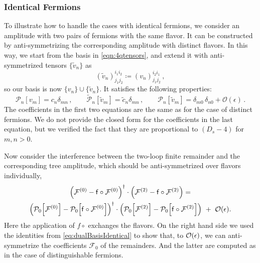\subsubsection{Identical Fermions}
To illustrate how to handle the cases with identical fermions,
we consider an amplitude with two pairs of fermions with the same flavor. 
It can be constructed by anti-symmetrizing the corresponding amplitude with distinct flavors.
In this way, we start from the basis in \cref{eqn:4qtensors},
and extend it with anti-symmetrized tensors $\{\tilde v_n\}$ as
\begin{equation}\label{eq:basisIdentical}
	(\tilde v_n)_{j_1j_2}^{i_1i_2} \coloneqq  (v_n)_{j_1j_2}^{i_2i_1}\,,
\end{equation}
so our basis is now $\{v_n\}\cup \{\tilde{v}_n\}$.
It satisfies the following properties:
\begin{equation}\label{eq:dualBasisIdentical}
  \mathcal{P}_n[v_m]= c_n \delta_{m n}\,,\qquad
  \mathcal{\tilde{P}}_n[\tilde{v}_m]= \tilde{c}_n \delta_{m n}\,,\qquad
  \mathcal{P}_n[\tilde{v}_m] = \delta_{m 0}\,\delta_{n 0}+\mathcal{O}(\epsilon)\,.
\end{equation}
The coefficients in the first two equations are the same as for the case of distinct fermions. 
We do not provide the closed form for the coefficients in the last equation, but
we verified the fact that they are proportional to $(D_s-4)$ for $m,n>0$.

Now consider the interference between the two-loop finite remainder and 
the corresponding tree amplitude, which should be anti-symmetrized over flavors individually,
\begin{multline}
  \qty(\mathcal{F}^{(0)} - \mathsf{f}\circ\mathcal{F}^{(0)})^\dagger \cdot 
    \qty(\mathcal{F}^{(2)} - \mathsf{f}\circ\mathcal{F}^{(2)}) = \\
    \qty(\mathcal{P}_0\qty[\mathcal{F}^{(0)}] - \mathcal{P}_0\qty[\mathsf{f}\circ\mathcal{F}^{(0)}])^\dagger \cdot 
    \qty( \mathcal{P}_0\qty[\mathcal{F}^{(2)}] - \mathcal{P}_0\qty[\mathsf{f}\circ\mathcal{F}^{(2)}]) ~+~ \order{\epsilon}.
\end{multline}
Here the application of $f\circ$ exchanges the flavors. 
On the right hand side we used the identities from \cref{eq:dualBasisIdentical} to
show that, to $\order{\epsilon}$, 
we can anti-symmetrize the coefficients $\mathcal{F}_0$ of the remainders.
And the latter are computed as in the case of distinguishable fermions.

